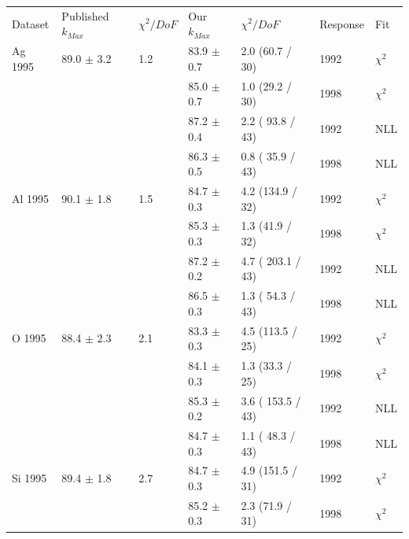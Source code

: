 \begin{table}[H]
  \begin{center}
    \begin{tabular}{|l||l|l|l|l|l|l|}
      \hline
      Dataset & Published $k_{Max}$ & $\chi^2 / DoF$ & Our $k_{Max}$ & $\chi^2 / DoF$  & Response & Fit \\
      \hhline{|=||=|=|=|=|=|=|}
       Ag 1995   & 89.0 $\pm$ 3.2 & 1.2 &83.9 $\pm$ 0.7 &  2.0 (60.7 / 30)  & 1992 & $\chi^2$ \\  
                 &                &     &85.0 $\pm$ 0.7 &  1.0 (29.2 / 30)  & 1998 & $\chi^2$ \\  
                                                                             
                &                &     & 87.2 $\pm$ 0.4 & 2.2 ( 93.8 / 43) & 1992 & NLL \\
                &                &     & 86.3 $\pm$ 0.5 & 0.8 ( 35.9 / 43) & 1998 & NLL \\      
      \hline                                                                
       Al 1995   & 90.1 $\pm$ 1.8 & 1.5 &84.7 $\pm$ 0.3 &  4.2 (134.9 / 32) & 1992 & $\chi^2$ \\  
                 &                &     &85.3 $\pm$ 0.3 &  1.3 (41.9 / 32)  & 1998 & $\chi^2$ \\  
                                                                            
                &                &     & 87.2 $\pm$ 0.2 & 4.7 ( 203.1 / 43) & 1992 & NLL \\
                &                &     & 86.5 $\pm$ 0.3 & 1.3 ( 54.3 / 43) & 1998 & NLL \\
      \hline                                                                
       O 1995    & 88.4 $\pm$ 2.3 & 2.1 &83.3 $\pm$ 0.3 &  4.5 (113.5 / 25) & 1992 & $\chi^2$ \\  
                 &                &     &84.1 $\pm$ 0.3 &  1.3 (33.3 / 25)  & 1998 & $\chi^2$ \\  
                                                                            
                &                &     & 85.3 $\pm$ 0.2 & 3.6 ( 153.5 / 43)& 1992 & NLL\\
                &                &     & 84.7 $\pm$ 0.3 & 1.1 ( 48.3 / 43) & 1998 & NLL\\
      \hline                                                                     
       Si 1995   & 89.4 $\pm$ 1.8 & 2.7 &84.7 $\pm$ 0.3 &  4.9 (151.5 / 31) & 1992 & $\chi^2$ \\  
                 &                &     &85.2 $\pm$ 0.3 &  2.3 (71.9 / 31)  & 1998 & $\chi^2$ \\  
                                                                             

\end{tabular}
\end{center}
\end{table}
